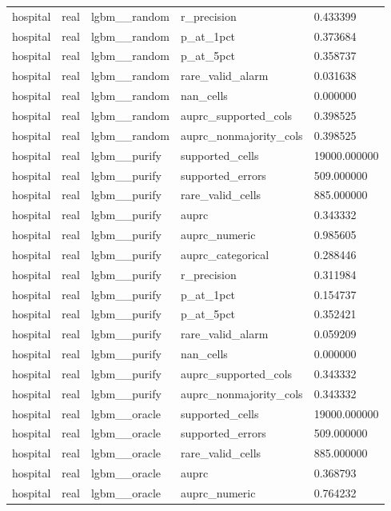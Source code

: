 \begin{tabular}{lllll}
hospital & real & lgbm\_\_random & r\_precision & 0.433399 \\
hospital & real & lgbm\_\_random & p\_at\_1pct & 0.373684 \\
hospital & real & lgbm\_\_random & p\_at\_5pct & 0.358737 \\
hospital & real & lgbm\_\_random & rare\_valid\_alarm & 0.031638 \\
hospital & real & lgbm\_\_random & nan\_cells & 0.000000 \\
hospital & real & lgbm\_\_random & auprc\_supported\_cols & 0.398525 \\
hospital & real & lgbm\_\_random & auprc\_nonmajority\_cols & 0.398525 \\
hospital & real & lgbm\_\_purify & supported\_cells & 19000.000000 \\
hospital & real & lgbm\_\_purify & supported\_errors & 509.000000 \\
hospital & real & lgbm\_\_purify & rare\_valid\_cells & 885.000000 \\
hospital & real & lgbm\_\_purify & auprc & 0.343332 \\
hospital & real & lgbm\_\_purify & auprc\_numeric & 0.985605 \\
hospital & real & lgbm\_\_purify & auprc\_categorical & 0.288446 \\
hospital & real & lgbm\_\_purify & r\_precision & 0.311984 \\
hospital & real & lgbm\_\_purify & p\_at\_1pct & 0.154737 \\
hospital & real & lgbm\_\_purify & p\_at\_5pct & 0.352421 \\
hospital & real & lgbm\_\_purify & rare\_valid\_alarm & 0.059209 \\
hospital & real & lgbm\_\_purify & nan\_cells & 0.000000 \\
hospital & real & lgbm\_\_purify & auprc\_supported\_cols & 0.343332 \\
hospital & real & lgbm\_\_purify & auprc\_nonmajority\_cols & 0.343332 \\
hospital & real & lgbm\_\_oracle & supported\_cells & 19000.000000 \\
hospital & real & lgbm\_\_oracle & supported\_errors & 509.000000 \\
hospital & real & lgbm\_\_oracle & rare\_valid\_cells & 885.000000 \\
hospital & real & lgbm\_\_oracle & auprc & 0.368793 \\
hospital & real & lgbm\_\_oracle & auprc\_numeric & 0.764232 \\

\end{tabular}
